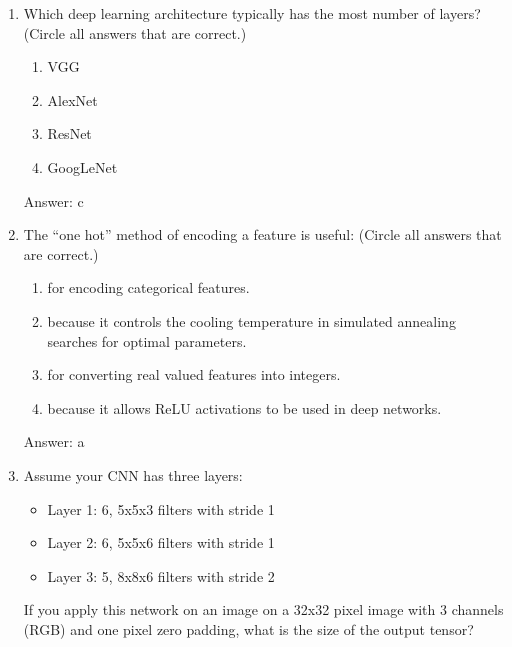 \documentclass[11pt]{report}
\begin{document}
\begin{enumerate}
\item
Which deep learning architecture typically has the most number of layers? (Circle all answers that are correct.)
\begin{enumerate}
\item  VGG
\item  AlexNet
\item  ResNet
\item  GoogLeNet
\end{enumerate}
\begin{mdframed}
Answer: c
\end{mdframed}
\item
The ``one hot'' method of encoding a feature is useful: (Circle all answers that are correct.)
\begin{enumerate}
\item for encoding categorical features.
\item because it controls the cooling temperature in simulated annealing searches for optimal parameters.
\item for converting real valued features into integers.
\item  because it allows ReLU activations to be used in deep networks.
\end{enumerate}
\begin{mdframed}
Answer: a
\end{mdframed}
\item
Assume your CNN has three layers:  
\begin{itemize}
\item  Layer 1: 6, 5x5x3 filters with stride 1
\item  Layer 2: 6, 5x5x6 filters with stride 1
\item  Layer 3: 5, 8x8x6 filters with stride 2
\end{itemize}
If you apply this network on an image on a 32x32 pixel image with 3 channels (RGB) and one pixel zero padding, what is the size of the output tensor?  
\vspace{0.2in}


\end{enumerate}
\end{document}
